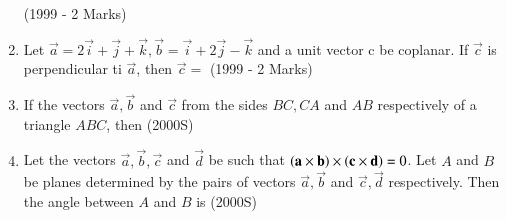 \documentclass[journal,12pt,twocolumn]{IEEEtran}
\theoremstyle{remark}
\begin{document}
\begin{enumerate}
\hfill (1999 - 2 Marks)
\begin{enumerate}
\end{enumerate}
\item Let $\vec{a}=2\vec{i}+\vec{j}+\vec{k},\vec{b}=\vec{i}+2\vec{j}-\vec{k}$ and a unit vector c be coplanar. If $\vec{c}$ is perpendicular ti $\vec{a}$, then $\vec{c}=$
\hfill (1999 - 2 Marks)
\begin{enumerate}
\end{enumerate}
\item If the vectors $\vec{a},\vec{b}$ and $\vec{c}$ from the sides $BC,CA$ and $AB$ respectively of a triangle $ABC$, then
\hfill (2000S)
\begin{enumerate}
\end{enumerate}
\item Let the vectors $\vec{a},\vec{b},\vec{c}$ and $\vec{d}$ be such that $\left(\mathbf{a} \times \mathbf{b}\right) \times \left(\mathbf{c} \times \mathbf{d}\right) = 0$. Let $A$ and $B$ be planes determined by the pairs of vectors $\vec{a},\vec{b}$ and $\vec{c},\vec{d}$ respectively. Then the angle between $A$ and $B$ is 
\hfill (2000S)
\begin{enumerate}
\begin{multicols}{4}

\end{multicols}
\end{enumerate}
\end{enumerate}
\end{document}
